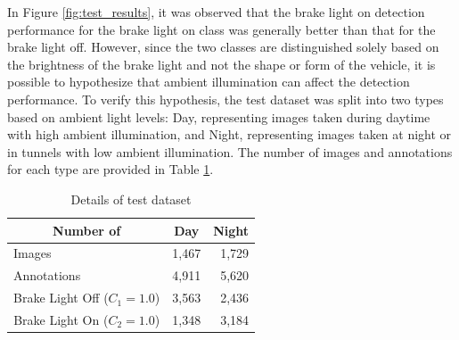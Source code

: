 In Figure \ref{fig:test_results}, it was observed that the brake light on detection performance for the brake light on class was generally better than that for the brake light off.
However, since the two classes are distinguished solely based on the brightness of the brake light and not the shape or form of the vehicle, it is possible to hypothesize that ambient illumination can affect the detection performance. 
To verify this hypothesis, the test dataset was split into two types based on ambient light levels: Day, representing images taken during daytime with high ambient illumination, and Night, representing images taken at night or in tunnels with low ambient illumination.
The number of images and annotations for each type are provided in Table \ref{tab:test_dataset}.

\begin{table}[h]
    \caption{Details of test dataset}
    \label{tab:test_dataset}
    \begin{tabular}{p{5cm} p{5cm} p{5cm}}
    \toprule
    \multicolumn{1}{c}{Number of}                          & \multicolumn{1}{c}{Day} & \multicolumn{1}{c}{Night} \\
    \midrule
    Images                              & \multicolumn{1}{r}{1,467}                     & \multicolumn{1}{r}{1,729}                    \\
    Annotations                         & \multicolumn{1}{r}{4,911}                    & \multicolumn{1}{r}{5,620}                   \\
    \multicolumn{1}{c}{Brake Light Off ($C_{1}=1.0$)} & \multicolumn{1}{r}{3,563}                    & \multicolumn{1}{r}{2,436}                    \\
    \multicolumn{1}{c}{Brake Light On ($C_{2}=1.0$)}  & \multicolumn{1}{r}{1,348}                     & \multicolumn{1}{r}{3,184}                   \\
    \bottomrule
    \end{tabular}%
\end{table}



